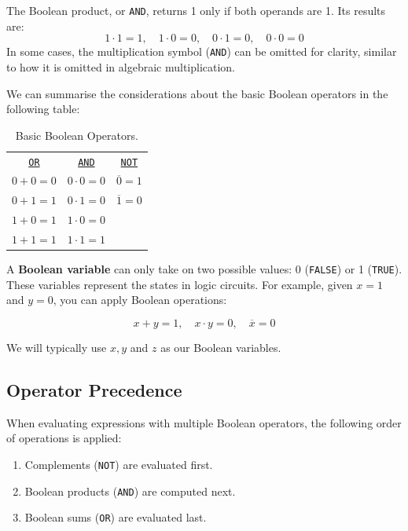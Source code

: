 The Boolean product, or \texttt{AND}, returns 1 only if both operands are 1. Its results are:
\[
1 \cdot 1 = 1, \quad 1 \cdot 0 = 0, \quad 0 \cdot 1 = 0, \quad 0 \cdot 0 = 0
\]
In some cases, the multiplication symbol (\texttt{AND}) can be omitted for clarity, similar to how it is omitted in algebraic multiplication.

We can summarise the considerations about the basic Boolean operators in the following table:

\begin{table}[h!]
    \begin{center}
    \begin{tabular}{ccc}
    \underline{\texttt{OR}} & \underline{\texttt{AND}} & \underline{\texttt{NOT}} \\
    $0 + 0 = 0$ & $0 \cdot 0 = 0$ & $\overline{0} = 1$ \\
    $0 + 1 = 1$ & $0 \cdot 1 = 0$ & $\overline{1} = 0$ \\
    $1 + 0 = 1$ & $1 \cdot 0 = 0$ & \\
    $1 + 1 = 1$ & $1 \cdot 1 = 1$ & \\
    \end{tabular}
    \end{center}
    \caption{Basic Boolean Operators.}
    \label{tab:basicops}
\end{table}


\begin{remark} A \textbf{Boolean variable} can only take on two possible values: 0 (\texttt{FALSE}) or 1 (\texttt{TRUE}). These variables represent the states in logic circuits. For example, given $x = 1$ and $y = 0$, you can apply Boolean operations:

\[
x + y = 1, \quad x \cdot y = 0, \quad \overline{x} = 0
\]

We will typically use $x, y$ and $z$ as our Boolean variables.

\end{remark}

\subsection*{Operator Precedence}
When evaluating expressions with multiple Boolean operators, the following order of operations is applied:
\begin{enumerate}
    \item Complements (\texttt{NOT}) are evaluated first.
    \item Boolean products (\texttt{AND}) are computed next.
    \item Boolean sums (\texttt{OR}) are evaluated last.
\end{enumerate}

